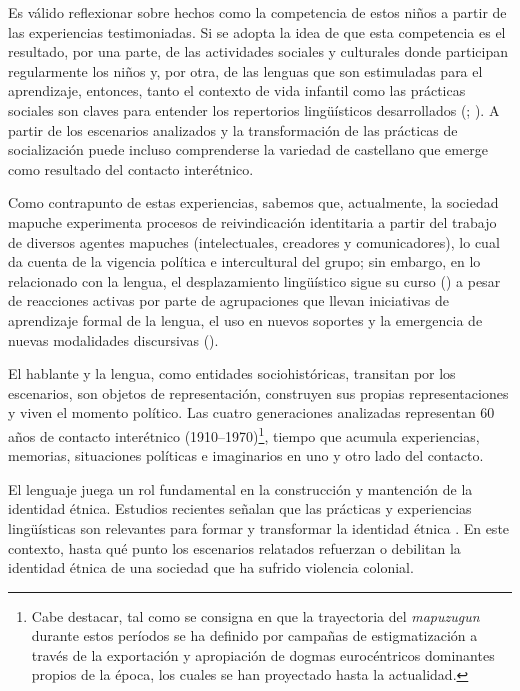\documentclass[output=paper]{../langscibook}
\begin{document}
Es válido reflexionar sobre hechos como la competencia de estos niños a partir de las experiencias testimoniadas. Si se adopta la idea de que esta competencia es el resultado, por una parte, de las actividades sociales y culturales donde participan regularmente los niños y, por otra, de las lenguas que son estimuladas para el aprendizaje, entonces, tanto el contexto de vida infantil como las prácticas sociales son claves para entender los repertorios lingüísticos desarrollados (\citealt{Duranti2000}; \citealt{OchsSchieffelin2006}). A partir de los escenarios analizados y la transformación de las prácticas de socialización puede incluso comprenderse la variedad de castellano que emerge como resultado del contacto interétnico.

Como contrapunto de estas experiencias, sabemos que, actualmente, la sociedad mapuche experimenta procesos de reivindicación identitaria a partir del trabajo de diversos agentes mapuches (intelectuales, creadores y comunicadores), lo cual da cuenta de la vigencia política e intercultural del grupo; sin embargo, en lo relacionado con la lengua, el desplazamiento lingüístico sigue su curso (\citealt{ZúñigaOlateVinet2017}) a pesar de reacciones activas por parte de agrupaciones que llevan iniciativas de aprendizaje formal de la lengua, el uso en nuevos soportes y la emergencia de nuevas modalidades discursivas (\citealt{OlateVinetWittigGonzález2019}).

El hablante y la lengua, como entidades sociohistóricas, transitan por los escenarios, son objetos de representación, construyen sus propias representaciones y viven el momento político. Las cuatro generaciones analizadas representan 60 años de contacto interétnico (1910--1970)\footnote{Cabe destacar, tal como se consigna en  \citet{OlateVinetEtAl2017} que la trayectoria del \textit{mapuzugun} durante estos períodos se ha definido por campañas de estigmatización a través de la exportación y apropiación de dogmas eurocéntricos dominantes propios de la época, los cuales se han proyectado hasta la actualidad.}, tiempo que acumula experiencias, memorias, situaciones políticas e imaginarios en uno y otro lado del contacto.

El lenguaje juega un rol fundamental en la construcción y mantención de la identidad étnica. Estudios recientes señalan que las prácticas y experiencias lingüísticas son relevantes para formar y transformar la identidad étnica \citep{Fought2011}. En este contexto, hasta qué punto los escenarios relatados refuerzan o debilitan la identidad étnica de una sociedad que ha sufrido violencia colonial.  
\end{document}

